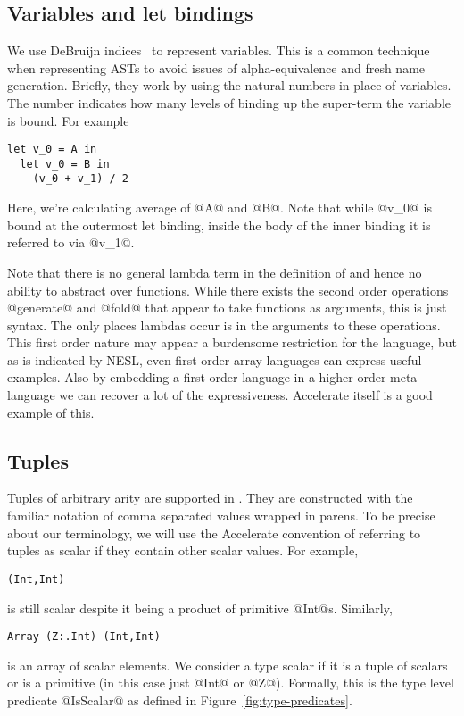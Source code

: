 \subsection{Variables and let bindings}

We use DeBruijn indices~\cite{DeBruijn1972} to represent variables. This is a common technique when representing ASTs to avoid issues of alpha-equivalence and fresh name generation. Briefly, they work by using the natural numbers in place of variables. The number indicates how many levels of binding up the super-term the variable is bound. For example
%
\begin{lstlisting}
let v_0 = A in
  let v_0 = B in
    (v_0 + v_1) / 2
\end{lstlisting}
%
Here, we're calculating average of @A@ and @B@. Note that while @v_0@ is bound at the outermost let binding, inside the body of the inner binding it is referred to via @v_1@.

Note that there is no general lambda term in the definition of \ndp{} and hence no ability to abstract over functions. While there exists the second order operations @generate@ and @fold@ that appear to take functions as arguments, this is just syntax. The only places lambdas occur is in the arguments to these operations. This first order nature may appear a burdensome restriction for the language, but as is indicated by NESL\cite{Blelloch:nesl1995}, even first order array languages can express useful examples. Also by embedding a first order language in a higher order meta language we can recover a lot of the expressiveness. Accelerate itself is a good example of this.

\subsection{Tuples}
Tuples of arbitrary arity are supported in \ndp{}. They are constructed with the familiar notation of comma separated values wrapped in parens. To be precise about our terminology, we will use the Accelerate convention of referring to tuples as scalar if they contain other scalar values. For example,
%
\begin{lstlisting}
(Int,Int)
\end{lstlisting}
%
is still scalar despite it being a product of primitive @Int@s. Similarly,
%
\begin{lstlisting}
Array (Z:.Int) (Int,Int)
\end{lstlisting}
%
is an array of scalar elements. We consider a type scalar if it is a tuple of scalars or is a primitive (in this case just @Int@ or @Z@). Formally, this is the type level predicate @IsScalar@ as defined in Figure~\ref{fig:type-predicates}.

